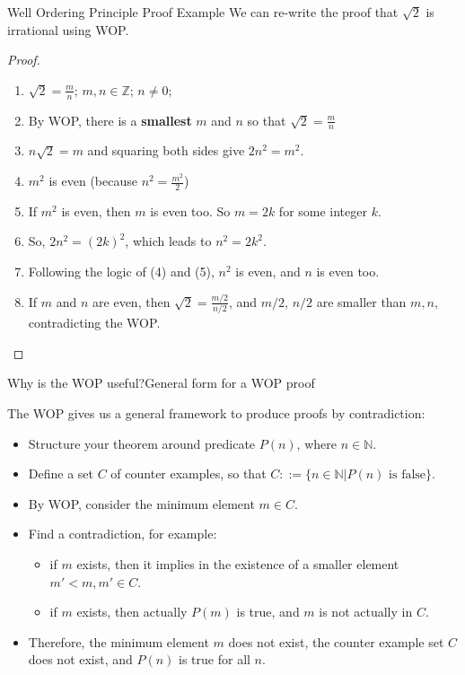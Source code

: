 \begin{frame}{Well Ordering Principle Proof Example}{}
  We can re-write the proof that $\sqrt{2}$ is irrational using WOP.

  \begin{proof}
  \begin{enumerate}
  \item $\sqrt{2} = \frac{m}{n}$; $m,n \in \mathbb{Z}$; $n\neq 0$;
  \item \alert{By WOP, there is a {\bf smallest} $m$ and $n$ so that $\sqrt{2} = \frac{m}{n}$}
  \item $n\sqrt{2} = m$ and squaring both sides give $2n^2 = m^2$.
  \item $m^2$ is even (because $n^2 = \frac{m^2}{2}$)
  \item If $m^2$ is even, then $m$ is even too. So $m = 2k$ for some integer $k$.
  \item So, $2n^2 = (2k)^2$, which leads to $n^2 = 2k^2$.
  \item Following the logic of (4) and (5), $n^2$ is even, and $n$ is even too.
  \item If $m$ and $n$ are even, then $\sqrt{2} = \frac{m/2}{n/2}$, and \alert{$m/2$, $n/2$ are smaller than $m,n$, contradicting the WOP}.
  \end{enumerate}
  \end{proof}
\end{frame}

\begin{frame}{Why is the WOP useful?}{General form for a WOP proof}

  The WOP gives us a general framework to produce proofs by contradiction:

  \begin{itemize}
    \item Structure your theorem around predicate $P(n)$, where $n \in \mathbb{N}$.
    \item Define a set $C$ of counter examples, so that $C ::=\{n \in \mathbb{N}| P(n) \text{ is false}\}$.
    \item By WOP, consider the minimum element $m \in C$.
    \item Find a contradiction, for example:
    \begin{itemize}
      \item if $m$ exists, then it implies in the existence of a smaller element $m' < m, m' \in C$.
      \item if $m$ exists, then actually $P(m)$ is true, and $m$ is not actually in $C$.
    \end{itemize}
    \item Therefore, the minimum element $m$ does not exist, the counter example set $C$ does not exist, and $P(n)$ is true for all $n$.
  \end{itemize}
\end{frame}

